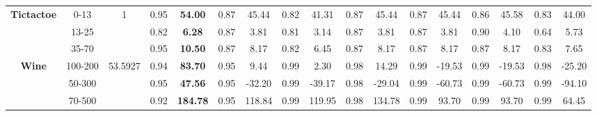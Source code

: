\documentclass[letterpaper]{article}
\theoremstyle{definition}
\begin{document}
\begin{table}
\begin{tabular}{|c|c|c|c|c|c|c|c|c|c|c|c|c|c|c|c|c|}
\multirow{3}{*}{\textbf{Tictactoe}} & 0-13      & 1         & 0.95  & \textbf{54.00}   & 0.87      & 45.44        & 0.82   & 41.31             & 0.87      & 45.44        & 0.87   & 45.44           & 0.86     & 45.58              & 0.83   & 44.00   \\ \cline{2-17} 
                                    & 13-25     &           & 0.82  & \textbf{6.28}    & 0.87      & 3.81         & 0.81   & 3.14              & 0.87      & 3.81         & 0.87   & 3.81            & 0.90     & 4.10               & 0.64   & 5.73             \\ \cline{2-17} 
                                    & 35-70     &           & 0.95  & \textbf{10.50}   & 0.87      & 8.17         & 0.82   & 6.45              & 0.87      & 8.17         & 0.87   & 8.17            & 0.87     & 8.17               & 0.83   & 7.65             \\ \hline
\multirow{3}{*}{\textbf{Wine}}      & 100-200   & 53.5927   & 0.94  & \textbf{83.70}   & 0.95      & 9.44         & 0.99   & 2.30              & 0.98      & 14.29        & 0.99   & -19.53          & 0.99     & -19.53             & 0.98   & -25.20           \\ \cline{2-17} 
                                    & 50-300    &           & 0.95  & \textbf{47.56}   & 0.95      & -32.20       & 0.99   & -39.17            & 0.98      & -29.04       & 0.99   & -60.73          & 0.99     & -60.73             & 0.99   & -94.10           \\ \cline{2-17} 
                                    & 70-500    &           & 0.92  & \textbf{184.78}  & 0.95      & 118.84       & 0.99   & 119.95            & 0.98      & 134.78       & 0.99   & 93.70           & 0.99     & 93.70              & 0.99   & 64.45            \\ \hline

\end{tabular}
\end{table}
\end{document}
